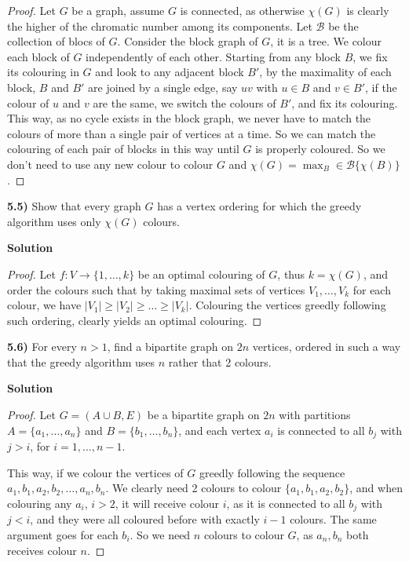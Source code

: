 \documentclass[11pt]{article}
\theoremstyle{plain}
\begin{document}
\begin{proof}
Let $G$ be a graph, assume $G$ is connected, as otherwise $\chi(G)$ is clearly the  higher of the chromatic number among its components. Let $\mathcal{B}$ be the collection of blocs of $G$. Consider the block graph of $G$, it is a tree. We colour each block of $G$ independently of each other. Starting from any block $B$, we fix its colouring in $G$ and look to any adjacent block $B'$, by the maximality of each block, $B$ and $B'$ are joined by a single edge, say $uv$ with $u \in B$ and $v \in B'$, if the colour of $u$ and $v$ are the same, we switch the colours of $B'$, and fix its colouring. This way, as no cycle exists in the block graph, we never have to match the colours of more than a single pair of vertices at a time. So we can match the colouring of each pair of blocks in this way until $G$ is properly coloured. So we don't need to use any new colour to colour $G$ and $\chi(G) = \max_B\in\mathcal{B}\{\chi(B)\}$.
\end{proof}

\textbf{5.5)} Show that every graph $G$ has a vertex ordering for which the greedy algorithm uses only $\chi(G)$ colours.

\vspace{.4cm}
\noindent \textbf{Solution}

\begin{proof}
Let $f:V \rightarrow \{1,\ldots,k\}$ be an optimal colouring of $G$, thus $k = \chi(G)$, and order the colours such that by taking maximal sets of vertices $V_1,\ldots,V_k$ for each colour, we have $|V_1| \geq |V_2| \geq \ldots\geq |V_k|$. Colouring the vertices greedly following such ordering, clearly yields an optimal colouring.
\end{proof}

\textbf{5.6)} For every $n>1$, find a bipartite graph on $2n$ vertices, ordered in such a way that the greedy algorithm uses $n$ rather that 2 colours.

\vspace{.4cm}
\noindent \textbf{Solution} 

\begin{proof}
Let $G=(A\cup B,E)$ be a bipartite graph on $2n$ with partitions $A=\{a_1,\ldots,a_n\}$ and $B=\{b_1,\ldots,b_n\}$, and each vertex $a_i$ is connected to all $b_j$ with $j>i$, for $i=1,\ldots,n-1$.

This way, if we colour the vertices of $G$ greedly following the sequence $a_1,b_1,a_2,b_2,\ldots,a_{n},b_n$. We clearly need 2 colours to colour $\{a_1,b_1,a_2,b_2\}$, and when colouring any $a_i$, $i>2$, it will receive colour $i$, as it is connected to all $b_j$ with $j<i$, and they were all coloured before with exactly $i-1$ colours. The same argument goes for each $b_i$. So we need $n$ colours to colour $G$, as $a_n,b_n$ both receives colour $n$.
\end{proof}
\end{document}
